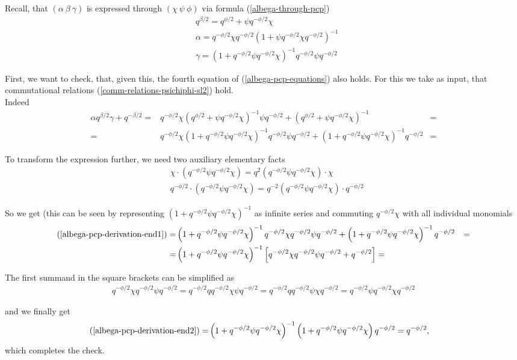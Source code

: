 \documentclass{article}
\newcommand{\lb}{\left (}
\newcommand{\rb}{\right )}
\newcommand{\lsb}{\left [}
\newcommand{\rsb}{\right ]}
\newcommand{\be}{\begin{eqnarray}}
\newcommand{\ee}{\end{eqnarray}}
\newcommand {\?}{\textit{???}}
\newcommand{\delabel}[1]{(\ref{#1})}
\begin{document}
Recall, that $(\alpha\ \beta\ \gamma)$ is expressed through $(\chi\ \psi\ \phi)$ via formula \delabel{albega-through-pcp}
\be
& q^{\beta/2} = q^{\phi/2} + \psi q^{-\phi/2} \chi \nonumber \\
& \alpha = q^{-\phi/2} \chi q^{-\phi/2} \lb 1 + \psi q^{-\phi/2} \chi q^{-\phi/2} \rb^{-1} \nonumber \\
& \gamma = \lb 1 + q^{-\phi/2} \psi q^{-\phi/2} \chi \rb^{-1} q^{-\phi/2} \psi q^{-\phi/2} \nonumber 
\ee

First, we want to check, that, given this, the fourth equation of \delabel{albega-pcp-equations} also holds.
For this we take as input, that commutational relations \delabel{comm-relations-psichiphi-sl2} hold.
\\
Indeed
\def\qbHalf{\lb q^{\phi/2} + \psi q^{-\phi/2} \chi \rb}
\def\qbMinusHalf{\qbHalf^{-1}}
\def\qbHalfNorm{\lb 1 + q^{-\phi/2} \psi q^{-\phi/2} \chi \rb}
\def\qbMinusHalfNorm{\qbHalfNorm^{-1}}
\be
\alpha q^{\beta/2} \gamma + q^{-\beta/2}
= & q^{-\phi/2}\chi \qbMinusHalf \psi q^{-\phi/2}
+ \qbMinusHalf & = \nonumber \\
\label{albega-pcp-derivation-end1}
= & q^{-\phi/2} \chi \qbMinusHalfNorm q^{-\phi/2} \psi q^{-\phi/2} + \qbMinusHalfNorm q^{-\phi/2} & =
\ee

To transform the expression further, we need two auxiliary elementary facts
\be
& \chi \cdot \lb q^{-\phi/2} \psi q^{-\phi/2} \chi \rb
= q^{2} \lb q^{-\phi/2}\psi q^{-\phi/2} \chi \rb \cdot \chi \nonumber \\
& q^{-\phi/2} \cdot \lb q^{-\phi/2} \psi q^{-\phi/2} \chi \rb
= q^{-2} \lb q^{-\phi/2}\psi q^{-\phi/2} \chi \rb \cdot q^{-\phi/2} \nonumber
\ee

So we get (this can be seen by representing $\qbMinusHalfNorm$ as infinite series and commuting $q^{-\phi/2}\chi$
with all individual monomials
\be
\delabel{albega-pcp-derivation-end1} = & \qbMinusHalfNorm q^{-\phi/2} \chi q^{-\phi/2} \psi q^{-\phi/2}
+ \qbMinusHalfNorm q^{-\phi/2} & = \nonumber \\
= & \qbMinusHalfNorm \lsb q^{-\phi/2} \chi q^{-\phi/2} \psi q^{-\phi/2} + q^{-\phi/2}\rsb = \label{albega-pcp-derivation-end2}
\ee

The first summand in the square brackets can be simplified as
\be
q^{-\phi/2} \chi q^{-\phi/2} \psi q^{-\phi/2} = q^{-\phi/2} q q^{-\phi/2} \chi \psi q^{-\phi/2}
= q^{-\phi/2} q q^{-\phi/2} \psi \chi q^{-\phi/2} = q^{-\phi/2} \psi q^{-\phi/2} \chi q^{-\phi/2} \nonumber
\ee

and we finally get
\be
\delabel{albega-pcp-derivation-end2} = & \qbMinusHalfNorm \qbHalfNorm q^{-\phi/2} = q^{-\phi/2},
\ee
which completes the check.
\end{document}
